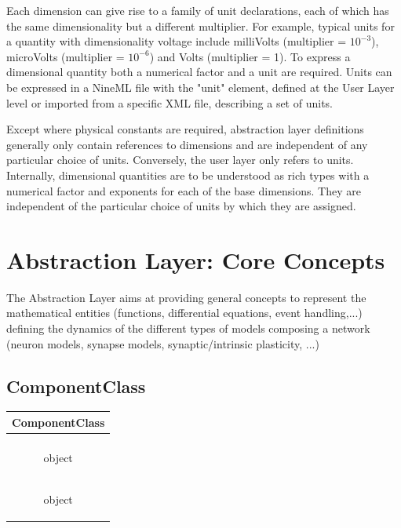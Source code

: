 \documentclass{article}
\begin{document}
Each dimension can give rise to a family of unit declarations, each of
which has the same dimensionality but a different multiplier. For example,
typical units for a quantity with dimensionality voltage include
milliVolts (multiplier = $10^{-3}$), microVolts (multiplier = $10^{-6}$)
and Volts (multiplier = 1).  To express a dimensional quantity both a
numerical factor and a unit are required. Units can be expressed in a NineML
file with the "unit" element, defined at the User Layer level or imported
from a specific XML file, describing a set of units.

Except where physical constants are required, abstraction layer definitions
generally only contain references to dimensions and are independent of any
particular choice of units. Conversely, the user layer only refers to units.
Internally, dimensional quantities are to be understood
as rich types with a numerical factor and exponents for each of the
base dimensions. They are independent of the particular choice of
units by which they are assigned.

\section{Abstraction Layer: Core Concepts }
\label{AbstractionL}

The Abstraction Layer aims at providing general concepts to represent the
mathematical entities (functions, differential equations, event handling,...)
defining the dynamics of the different types of models composing a network
(neuron models, synapse models, synaptic/intrinsic
plasticity, ...)

\subsection{ComponentClass}

\begin{table}[htb]
\center
\begin{tabular}{|c|}
\hline
\hline
ComponentClass \\
\hline \\
\colorbox{issuecolor}{\parbox{0.4\linewidth}
{ object}} \\
\hline
\colorbox{issuecolor}{\parbox{0.4\linewidth}
{ object}} \\
\hline
\end{tabular}
\end{table}
\end{document}

